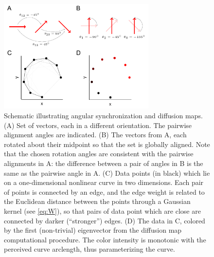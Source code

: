 \begin{figure}[t]
\centering
\includegraphics[width=0.7\textwidth]{fig2}
\caption[Schematic illustrating angular synchronization and diffusion maps]{Schematic illustrating angular synchronization and diffusion maps. (A) Set of vectors, each in a different orientation. The pairwise alignment angles are indicated. (B) The vectors from A, each rotated about their midpoint so that the set is globally aligned. Note that the chosen rotation angles are consistent with the pairwise alignments in A: the difference between a pair of angles in B is the same as the pairwise angle in A. (C) Data points (in black) which lie on a one-dimensional nonlinear curve in two dimensions. Each pair of points is connected by an edge, and the edge weight is related to the Euclidean distance between the points through a Gaussian kernel (see \eqref{eq:W}), so that pairs of data point which are close are connected by darker (``stronger'') edges. (D) The data in C, colored by the first (non-trivial) eigenvector from the diffusion map computational procedure. The color intensity is monotonic with the perceived curve arclength, thus parameterizing the curve.}
\label{fig:schematics}
\end{figure}


